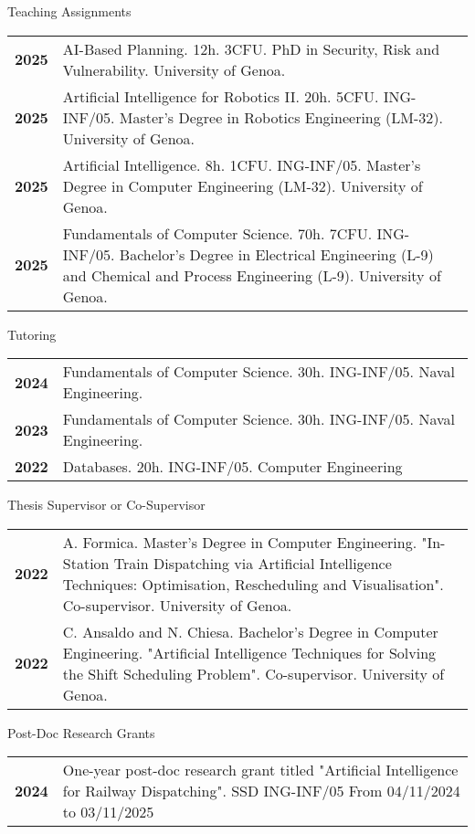 \documentclass{resume} %
\begin{document}
\begin{rSection}{Teaching Assignments}
	\begin{tabularx}{0.95\textwidth} {lp{14cm}}
 \textbf{2025} & AI-Based Planning. 12h. 3CFU. PhD in Security, Risk and Vulnerability. University of Genoa.  \\
 \textbf{2025} & Artificial Intelligence for Robotics II. 20h. 5CFU. ING-INF/05. Master’s Degree in Robotics Engineering (LM-32). University of Genoa.  \\
  \textbf{2025} & Artificial Intelligence. 8h. 1CFU. ING-INF/05. Master’s Degree in Computer Engineering (LM-32). University of Genoa.  \\
  \textbf{2025} & Fundamentals of Computer Science. 70h. 7CFU. ING-INF/05. Bachelor’s Degree in Electrical Engineering (L-9) and Chemical and Process Engineering (L-9). University of Genoa.  \\
\end{tabularx}
\end{rSection}
\begin{rSection}{Tutoring}
	\begin{tabularx}{0.95\textwidth} {lp{14cm}}
 \textbf{2024} & Fundamentals of Computer Science. 30h. ING-INF/05. Naval Engineering.  \\
 \textbf{2023} & Fundamentals of Computer Science. 30h. ING-INF/05. Naval Engineering.  \\
 \textbf{2022} & Databases. 20h. ING-INF/05. Computer Engineering \end{tabularx}
\end{rSection}
\pagebreak
\begin{rSection}{Thesis Supervisor or Co-Supervisor}
	\begin{tabularx}{0.95\textwidth} {lp{14cm}}
 \textbf{2022} & A. Formica. Master’s Degree in Computer Engineering. "In-Station Train Dispatching via Artificial Intelligence Techniques: Optimisation, Rescheduling and Visualisation". Co-supervisor. University of Genoa.  \\
 \textbf{2022} & C. Ansaldo and N. Chiesa. Bachelor’s Degree in Computer Engineering. "Artificial Intelligence Techniques for Solving the Shift Scheduling Problem". Co-supervisor. University of Genoa.
 \end{tabularx}
\end{rSection}

\begin{rSection}{Post-Doc Research Grants}
	\begin{tabularx}{0.95\textwidth} {lp{14cm}}
 \textbf{2024} & One-year post-doc research grant titled "Artificial Intelligence for Railway Dispatching". SSD ING-INF/05 From 04/11/2024 to 03/11/2025
 \end{tabularx}
\end{rSection}
\end{document}
